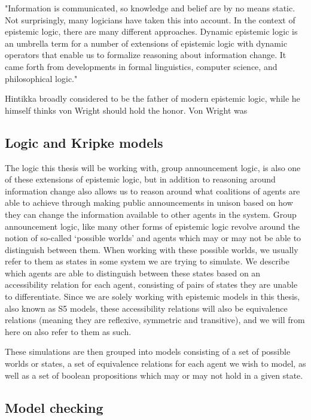 "Information is communicated, so knowledge and belief are by no means static.
Not surprisingly, many logicians have taken this into account. In the context of
epistemic logic, there are many different approaches. Dynamic epistemic logic
is an umbrella term for a number of extensions of epistemic logic with dynamic
operators that enable us to formalize reasoning about information change. It
came forth from developments in formal linguistics, computer science, and
philosophical logic."\cite{Ditmarsch2007}


Hintikka broadly considered to be the father of modern epistemic logic, while he himself thinks von Wright should hold the honor. Von Wright was 


\subsection{Logic and Kripke models}

The logic this thesis will be working with, group announcement logic, is also one of these extensions of epistemic logic, but in addition to reasoning around information change also allows us to reason around what coalitions of agents are able to achieve through making public announcements in unison based on how they can change the information available to other agents in the system. Group announcement logic, like many other forms of epistemic logic revolve around the notion of so-called `possible worlds' and agents which may or may not be able to distinguish between them. When working with these possible worlds, we usually refer to them as states in some system we are trying to simulate. We describe which agents are able to distinguish between these states based on an accessibility relation for each agent, consisting of pairs of states they are unable to differentiate. Since we are solely working with epistemic models in this thesis, also known as S5 models, these accessibility relations will also be equivalence relations (meaning they are reflexive, symmetric and transitive), and we will from here on also refer to them as such.

These simulations are then grouped into models consisting of a set of possible worlds or states, a set of equivalence relations for each agent we wish to model, as well as a set of boolean propositions which may or may not hold in a given state. 



\subsection{Model checking}


